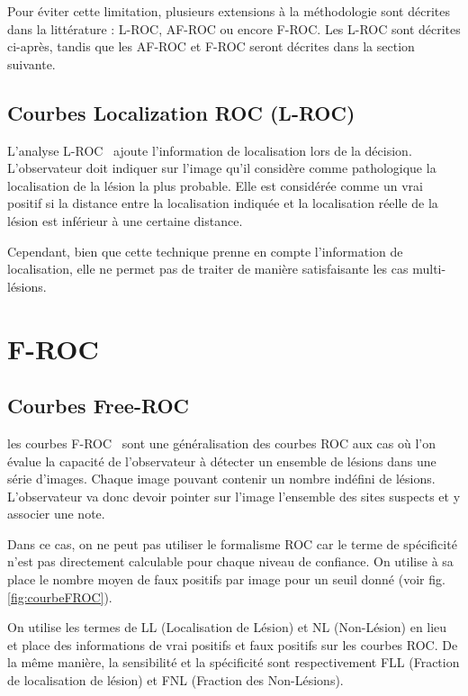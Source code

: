 Pour éviter cette limitation, plusieurs extensions à la méthodologie \ROC sont décrites dans la littérature : L-ROC, AF-ROC ou encore F-ROC. Les L-ROC sont décrites ci-après, tandis que les AF-ROC et F-ROC seront décrites dans la section suivante.

\subsection{Courbes Localization ROC (L-ROC)}

L'analyse L-ROC~\cite{farquhar1999roc} ajoute l'information de localisation lors de la décision. L'observateur doit indiquer sur l'image qu'il considère comme pathologique la localisation de la lésion la plus probable. Elle est considérée comme un vrai positif si la distance entre la localisation indiquée et la localisation réelle de la lésion est inférieur à une certaine distance.

Cependant, bien que cette technique prenne en compte l'information de localisation, elle ne permet pas de traiter de manière satisfaisante les cas multi-lésions. 


\section{F-ROC}	


\subsection{Courbes Free-ROC}
\label{lab:FROC}

les courbes F-ROC~\cite{bunch1978free} sont une généralisation des courbes ROC aux cas où l'on évalue la capacité de l'observateur à détecter un ensemble de lésions dans une série d'images. Chaque image pouvant contenir un nombre indéfini de lésions. L'observateur va donc devoir pointer sur l'image l'ensemble des sites suspects et y associer une note.

Dans ce cas, on ne peut pas utiliser le formalisme ROC car le terme de spécificité n'est pas directement calculable pour chaque niveau de confiance. On utilise à sa place le nombre moyen de faux positifs par image pour un seuil donné (voir fig.\ref{fig:courbeFROC}).

On utilise les termes de LL (Localisation de Lésion) et NL (Non-Lésion) en lieu et place des informations de vrai positifs et faux positifs sur les courbes ROC. De la même manière, la sensibilité et la spécificité sont respectivement FLL (Fraction de localisation de lésion) et FNL (Fraction des Non-Lésions).

